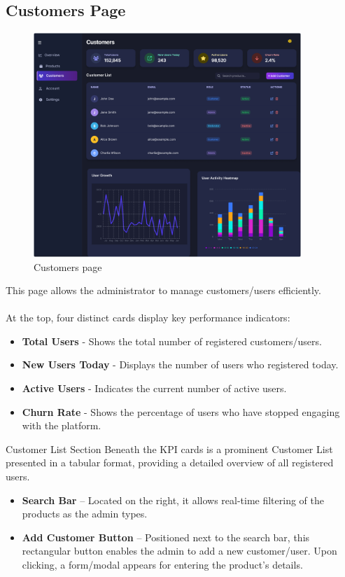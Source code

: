 \documentclass[11pt,a4paper]{article}
\begin{document}
\subsection{Customers Page}\label{subsec:customers-page}
	\begin{figure}[h]
    \centering
    \includegraphics[width=0.9\textwidth]{pictures/admin/Customers_Admin}
     \caption{Customers page}\label{fig:figure3}
\end{figure}
This page allows the administrator to manage customers/users efficiently. \\ \\
At the top, four distinct cards display key performance indicators:
\begin{itemize}
\item \textbf{Total Users} - Shows the total number of registered customers/users.
\item \textbf{New Users Today} - Displays the number of users who registered today.
\item \textbf{Active Users} - Indicates the current number of active users.
\item \textbf{Churn Rate} - Shows the percentage of users who have stopped engaging with the platform.
\end{itemize}
Customer List Section
Beneath the KPI cards is a prominent Customer List presented in a tabular format, providing a detailed overview of all registered users.
\begin{itemize}
\item \textbf{Search Bar} – Located on the right, it allows real-time filtering of the products as the admin types.
\item \textbf{Add Customer Button} – Positioned next to the search bar, this rectangular button enables the admin to add a new customer/user. Upon clicking, a form/modal appears for entering the product’s details.
\end{itemize}
\end{document}
